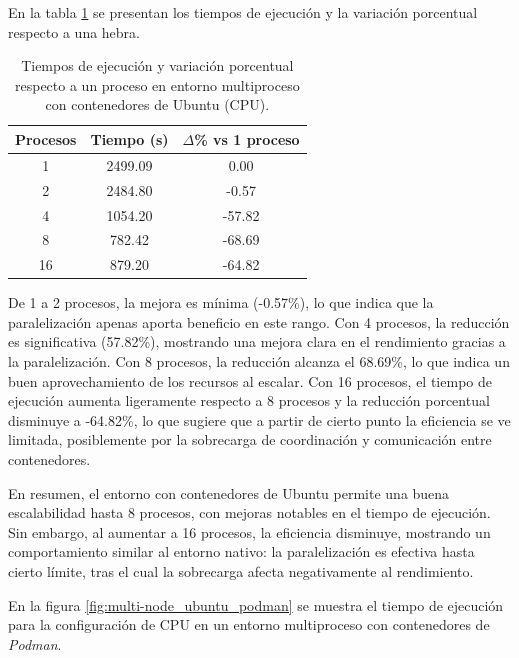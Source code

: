 En la tabla \ref{tab:multi-node_ubuntu_docker} se presentan los tiempos de ejecución y la variación porcentual respecto a una hebra.

\begin{table}[ht]
    \centering
    \begin{tabular}{|c|c|c|}
        \hline
        \textbf{Procesos} & \textbf{Tiempo (s)} & \textbf{$\Delta$\% vs 1 proceso} \\
        \hline
        1                 & 2499.09             & 0.00                             \\
        2                 & 2484.80             & -0.57                            \\
        4                 & 1054.20             & -57.82                           \\
        8                 & 782.42              & -68.69                           \\
        16                & 879.20              & -64.82                           \\
        \hline
    \end{tabular}
    \caption{Tiempos de ejecución y variación porcentual respecto a un proceso en entorno multiproceso con contenedores de Ubuntu (CPU).}
    \label{tab:multi-node_ubuntu_docker}
\end{table}

De 1 a 2 procesos, la mejora es mínima (-0.57\%), lo que indica que la paralelización apenas aporta beneficio en este rango. Con 4 procesos, la reducción es significativa (57.82\%), mostrando una mejora clara en el rendimiento gracias a la paralelización. Con 8 procesos, la reducción alcanza el 68.69\%, lo que indica un buen aprovechamiento de los recursos al escalar. Con 16 procesos, el tiempo de ejecución aumenta ligeramente respecto a 8 procesos y la reducción porcentual disminuye a -64.82\%, lo que sugiere que a partir de cierto punto la eficiencia se ve limitada, posiblemente por la sobrecarga de coordinación y comunicación entre contenedores.

En resumen, el entorno con contenedores de Ubuntu permite una buena escalabilidad hasta 8 procesos, con mejoras notables en el tiempo de ejecución. Sin embargo, al aumentar a 16 procesos, la eficiencia disminuye, mostrando un comportamiento similar al entorno nativo: la paralelización es efectiva hasta cierto límite, tras el cual la sobrecarga afecta negativamente al rendimiento.

En la figura \ref{fig:multi-node_ubuntu_podman} se muestra el tiempo de ejecución para la configuración de CPU en un entorno multiproceso con contenedores de \textit{Podman}.

